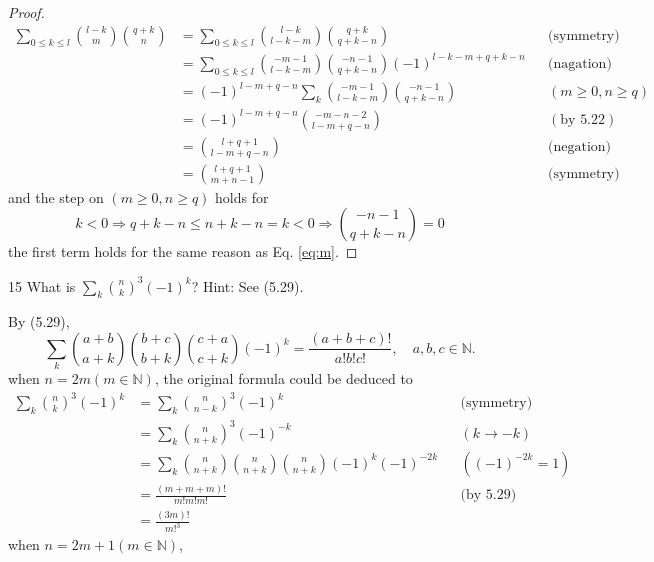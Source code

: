 \documentclass[a4paper,12pt]{article}
\makeatletter
\newtheorem*{solution}{Solution}
\theoremstyle{definition}
\renewenvironment{solution}[1][Solution] {\par\pushQED{\qed}\normalfont\topsep6\p@\@plus6\p@\relax\trivlist\item[\hskip\labelsep\bfseries#1\@addpunct{.}]\ignorespaces}{\popQED\endtrivlist\@endpefalse} \makeatother
\newenvironment{problems}{\begin{list}{}{\renewcommand{\makelabel}[1]{\textbf{##1}\hfil}}}{\end{list}}
\makeatother
\begin{document}
\begin{problems}
\begin{proof}
\begin{align*}
            \sum_{0\leq k\leq l}\binom{l-k}{m}\binom{q+k}{n} 
            &= \sum_{0\leq k\leq l}\binom{l-k}{l-k-m}\binom{q+k}{q+k-n} && \text{(symmetry)} \\
            &= \sum_{0\leq k\leq l}\binom{-m-1}{l-k-m}\binom{-n-1}{q+k-n}(-1)^{l-k-m+q+k-n} &&\text{(nagation)}\\
            &= (-1)^{l-m+q-n} \sum_{k}\binom{-m-1}{l-k-m}\binom{-n-1}{q+k-n} && (m\geq 0,n\geq q) \\
            &= (-1)^{l-m+q-n} \binom{-m-n-2}{l-m+q-n} && (\text{by }5.22) \\
            &= \binom{l+q+1}{l-m+q-n} && \text{(negation)} \\
            &= \binom{l+q+1}{m+n-1} && \text{(symmetry)}
        \end{align*}
        and the step on $(m\geq 0,n\geq q)$ holds for
        \begin{equation*}
            k<0 \Rightarrow q+k-n\leq n+k-n = k<0 \Rightarrow\binom{-n-1}{q+k-n} = 0
        \end{equation*}
        the first term holds for the same reason as Eq. \eqref{eq:m}.
   \end{proof} 
   \item[15]What is $\sum_k\binom{n}{k}^3(-1)^k$? Hint: See (5.29).
   \begin{solution}
       By (5.29),
       \begin{equation*}
           \sum_{k}\binom{a+b}{a+k}\binom{b+c}{b+k}\binom{c+a}{c+k}(-1)^k = \frac{(a+b+c)!}{a!b!c!},\quad a,b,c\in\mathbb{N}.
       \end{equation*}
       when $n=2m(m\in\mathbb{N})$, the original formula could be deduced to
       \begin{align*}
        \sum_k\binom{n}{k}^3(-1)^k 
        &= \sum_k\binom{n}{n-k}^3(-1)^k &&\text{(symmetry)} \\
        &= \sum_k\binom{n}{n+k}^3(-1)^{-k} &&(k\rightarrow-k)\\
        &= \sum_k \binom{n}{n+k}\binom{n}{n+k}\binom{n}{n+k}(-1)^k(-1)^{-2k} &&((-1)^{-2k}=1)\\
        &= \frac{(m+m+m)!}{m!m!m!} &&\text{(by 5.29)}\\
        &= \frac{(3m)!}{m!^3}
       \end{align*}
       when $n=2m+1(m\in\mathbb{N})$, 
       \begin{equation*}

\end{equation*}
\end{solution}
\end{problems}
\end{document}
